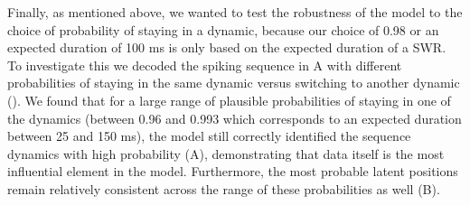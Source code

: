 \documentclass[9pt,lineno]{elife}
\begin{document}
Finally, as mentioned above, we wanted to test the robustness of the model to the choice of probability of staying in a dynamic, because our choice of 0.98 or an expected duration of 100 ms is only based on the expected duration of a SWR. To investigate this we decoded the spiking sequence in A with different probabilities of staying in the same dynamic versus switching to another dynamic (). We found that for a large range of plausible probabilities of staying in one of the dynamics (between 0.96 and 0.993 which corresponds to an expected duration between 25 and 150 ms), the model still correctly identified the sequence dynamics with high probability (A), demonstrating that data itself is the most influential element in the model. Furthermore, the most probable latent positions remain relatively consistent across the range of these probabilities as well (B).
\end{document}
